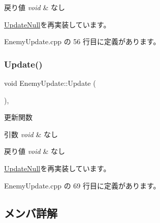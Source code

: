 \begin{DoxyRetVals}{戻り値}
{\em void} & なし \\
\hline
\end{DoxyRetVals}


\mbox{\hyperlink{class_update_null_a820189d686ec62f7a30d547118c419df}{Update\+Null}}を再実装しています。



 Enemy\+Update.\+cpp の 56 行目に定義があります。

\mbox{\label{class_enemy_update_ae9662f3a2d064dc69c0d68293e60f051}} 
\subsubsection{\texorpdfstring{Update()}{Update()}}
{\footnotesize\ttfamily void Enemy\+Update\+::\+Update (\begin{DoxyParamCaption}{ }\end{DoxyParamCaption})\hspace{0.3cm}{\ttfamily [override]}, {\ttfamily [virtual]}}



更新関数 


\begin{DoxyParams}{引数}
{\em void} & なし \\
\hline
\end{DoxyParams}

\begin{DoxyRetVals}{戻り値}
{\em void} & なし \\
\hline
\end{DoxyRetVals}


\mbox{\hyperlink{class_update_null_ab3f9cabc6ddcb4ef8743f212c26be144}{Update\+Null}}を再実装しています。



 Enemy\+Update.\+cpp の 69 行目に定義があります。



\subsection{メンバ詳解}
\mbox{\label{class_enemy_update_a339b9c72d3144781291bc333dc0c971f}} 
